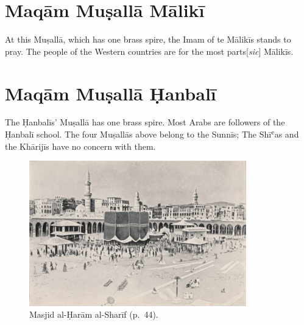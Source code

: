 \section*{Maqām Muṣallā Mālikī}

At this Muṣallā, which has one brass spire, the Imam of te Mālikīs stands to pray. The people of the Western countries are for the most parts[\textit{sic}] Mālikīs.

\section*{Maqām Muṣallā Ḥanbalī}

The Ḥanbalīs' Muṣallā has one brass spire. Most Arabs are followers of the Ḥanbalī school. The four Muṣallās above belong to the Sunnīs; The Shīʿas and the Khārijīs have no concern with them.

\begin{figure}[ht]
  \begin{center}
    \includegraphics[width=0.84\textwidth]{images/haram1}
  \end{center}
  \caption*{Masjid al-Ḥarām al-Sharīf (p.\ 44).}
\end{figure}